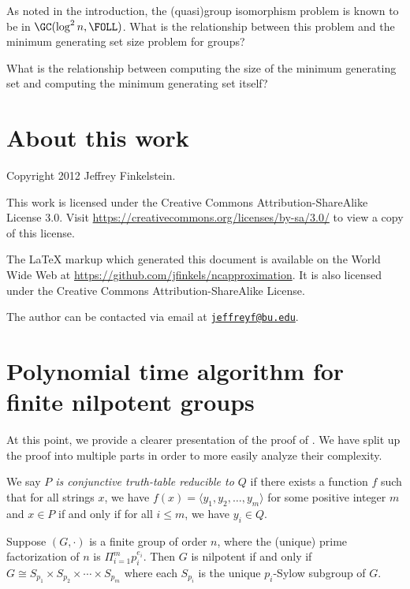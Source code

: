 \documentclass{article}
\newcommand{\email}[1]{\href{mailto:#1}{\nolinkurl{#1}}}
\begin{document}
As noted in the introduction, the (quasi)group isomorphism problem is known to be in $\GC(\log^2 n, \FOLL)$.
What is the relationship between this problem and the minimum generating set size problem for groups?

What is the relationship between computing the size of the minimum generating set and computing the minimum generating set itself?

\section{About this work}

Copyright 2012 Jef{}frey Finkelstein.

This work is licensed under the Creative Commons Attribution-ShareAlike License 3.0.
Visit \mbox{\url{https://creativecommons.org/licenses/by-sa/3.0/}} to view a copy of this license.

The \LaTeX{} markup which generated this document is available on the World Wide Web at \mbox{\url{https://github.com/jfinkels/ncapproximation}}.
It is also licensed under the Creative Commons Attribution-ShareAlike License.

The author can be contacted via email at \email{jeffreyf@bu.edu}.




\appendix
\section{Polynomial time algorithm for finite nilpotent groups}\label{app:p}

At this point, we provide a clearer presentation of the proof of \cite[Theorem~7]{at06}.
We have split up the proof into multiple parts in order to more easily analyze their complexity.

We say \emph{$P$ is conjunctive truth-table reducible to $Q$} if there exists a function $f$ such that for all strings $x$, we have $f(x) = \langle y_1, y_2, \dotsc, y_m \rangle$ for some positive integer $m$ and $x \in P$ if and only if for all $i \leq m$, we have $y_i \in Q$.

\begin{lemma}\label{lem:sylow}
  Suppose $(G, \cdot)$ is a finite group of order $n$, where the (unique) prime factorization of $n$ is $\Pi_{i = 1}^m p_i^{e_i}$.
  Then $G$ is nilpotent if and only if $G \cong S_{p_1} \times S_{p_2} \times \dotsb \times S_{p_m}$ where each $S_{p_i}$ is the unique $p_i$-Sylow subgroup of $G$.
\end{lemma}
\end{document}
